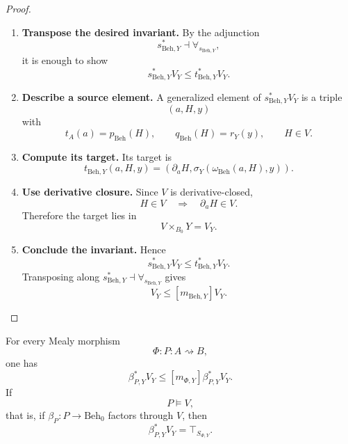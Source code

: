 \begin{proof}
\leavevmode
\begin{enumerate}
  \item \textbf{Transpose the desired invariant.}
  By the adjunction
  \[
    s_{\mathrm{Beh},Y}^*\dashv\forall_{s_{\mathrm{Beh},Y}},
  \]
  it is enough to show
  \[
    s_{\mathrm{Beh},Y}^*V_Y
    \leq
    t_{\mathrm{Beh},Y}^*V_Y.
  \]

  \item \textbf{Describe a source element.}
  A generalized element of \(s_{\mathrm{Beh},Y}^*V_Y\) is a triple
  \[
    (a,H,y)
  \]
  with
  \[
    t_A(a)=p_{\mathrm{Beh}}(H),
    \qquad
    q_{\mathrm{Beh}}(H)=r_Y(y),
    \qquad
    H\in V.
  \]

  \item \textbf{Compute its target.}
  Its target is
  \[
    t_{\mathrm{Beh},Y}(a,H,y)
    =
    \left(
      \partial_aH,
      \sigma_Y(\omega_{\mathrm{Beh}}(a,H),y)
    \right).
  \]

  \item \textbf{Use derivative closure.}
  Since \(V\) is derivative-closed,
  \[
    H\in V
    \quad\Longrightarrow\quad
    \partial_aH\in V.
  \]
  Therefore the target lies in
  \[
    V\times_{B_0}Y=V_Y.
  \]

  \item \textbf{Conclude the invariant.}
  Hence
  \[
    s_{\mathrm{Beh},Y}^*V_Y
    \leq
    t_{\mathrm{Beh},Y}^*V_Y.
  \]
  Transposing along
  \(s_{\mathrm{Beh},Y}^*\dashv\forall_{s_{\mathrm{Beh},Y}}\) gives
  \[
    V_Y\leq [m_{\mathrm{Beh},Y}]V_Y.
  \]
\end{enumerate}
\end{proof}

\begin{corollary}
\label{cor:pullback-invariance}
For every Mealy morphism
\[
  \Phi:P:A\rightsquigarrow B,
\]
one has
\[
  \beta_{P,Y}^*V_Y
  \leq
  [m_{\Phi,Y}]\beta_{P,Y}^*V_Y.
\]
If
\[
  P\models V,
\]
that is, if \(\beta_P:P\to\mathrm{Beh}_0\) factors through \(V\), then
\[
  \beta_{P,Y}^*V_Y
  =
  \top_{S_{\Phi,Y}}.
\]
\end{corollary}

